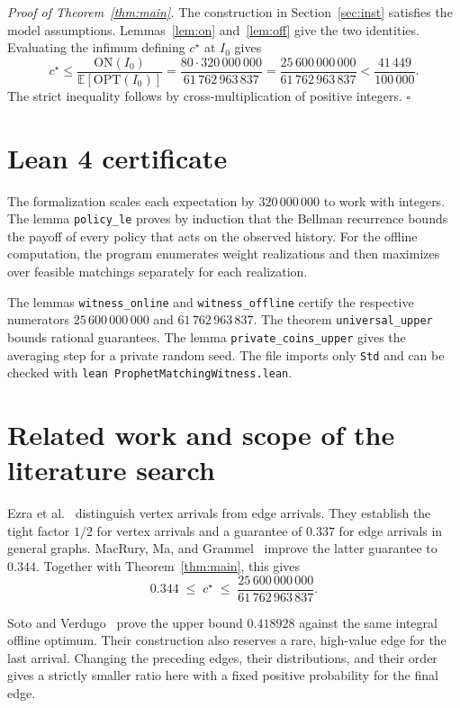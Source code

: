 \documentclass[11pt,a4paper]{article}
\newcommand{\E}{\mathbb{E}}
\newcommand{\OPT}{\mathrm{OPT}}
\newcommand{\numon}{25\,600\,000\,000}
\newcommand{\numoff}{61\,762\,963\,837}
\newcommand{\masa}{320\,000\,000}
\newenvironment{prueba}[1][Proof]{\par\smallskip\noindent\textit{#1.}\enspace}{\unskip\nobreak\hfill\(\square\)\par\smallskip}
\newcommand{\ON}{\mathrm{ON}}
\begin{document}
\begin{prueba}[Proof of Theorem~\ref{thm:main}]
The construction in Section~\ref{sec:inst} satisfies the model assumptions. Lemmas~\ref{lem:on} and~\ref{lem:off} give the two identities. Evaluating the infimum defining \(c^\star\) at \(I_0\) gives
\[
 c^\star\leq\frac{\ON(I_0)}{\E[\OPT(I_0)]}
 =\frac{80\cdot\masa}{\numoff}
 =\frac{\numon}{\numoff}<\frac{41\,449}{100\,000}.
\]
The strict inequality follows by cross-multiplication of positive integers.
\end{prueba}

\clearpage
\section{Lean 4 certificate}
The formalization scales each expectation by \(\masa\) to work with integers. The lemma \texttt{policy\_le} proves by induction that the Bellman recurrence bounds the payoff of every policy that acts on the observed history. For the offline computation, the program enumerates weight realizations and then maximizes over feasible matchings separately for each realization.

{\raggedright The lemmas \texttt{witness\_online} and \texttt{witness\_offline} certify the respective numerators \(\numon\) and \(\numoff\). The theorem \texttt{universal\_upper} bounds rational guarantees. The lemma \texttt{private\_coins\_upper} gives the averaging step for a private random seed. The file imports only \texttt{Std} and can be checked with \texttt{lean ProphetMatchingWitness.lean}.\par}


\section{Related work and scope of the literature search}
Ezra et al.~\cite{ezra} distinguish vertex arrivals from edge arrivals. They establish the tight factor \(1/2\) for vertex arrivals and a guarantee of \(0.337\) for edge arrivals in general graphs. MacRury, Ma, and Grammel~\cite{mmg} improve the latter guarantee to \(0.344\). Together with Theorem~\ref{thm:main}, this gives
\[
 0.344 \;\leq\; c^\star \;\leq\; \frac{\numon}{\numoff}.
\]

Soto and Verdugo~\cite[Theorem~1(b)]{sv} prove the upper bound \(0.418928\) against the same integral offline optimum. Their construction also reserves a rare, high-value edge for the last arrival. Changing the preceding edges, their distributions, and their order gives a strictly smaller ratio here with a fixed positive probability for the final edge.
\end{document}
